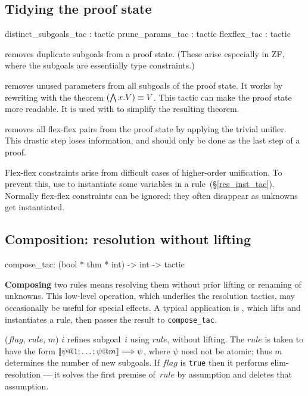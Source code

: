 \subsection{Tidying the proof state}
\begin{ttbox} 
distinct_subgoals_tac : tactic
prune_params_tac      : tactic
flexflex_tac          : tactic
\end{ttbox}
\begin{ttdescription}
\item[\ttindexbold{distinct_subgoals_tac}] removes duplicate subgoals from a
  proof state.  (These arise especially in ZF, where the subgoals are
  essentially type constraints.)

\item[\ttindexbold{prune_params_tac}]  
  removes unused parameters from all subgoals of the proof state.  It works
  by rewriting with the theorem $(\bigwedge x. V)\equiv V$.  This tactic can
  make the proof state more readable.  It is used with
   to simplify the resulting theorem.

\item[\ttindexbold{flexflex_tac}]  
  removes all flex-flex pairs from the proof state by applying the trivial
  unifier.  This drastic step loses information, and should only be done as
  the last step of a proof.

  Flex-flex constraints arise from difficult cases of higher-order
  unification.  To prevent this, use  to instantiate
  some variables in a rule~({\S}\ref{res_inst_tac}).  Normally flex-flex
  constraints can be ignored; they often disappear as unknowns get
  instantiated.
\end{ttdescription}


\subsection{Composition: resolution without lifting}
\begin{ttbox}
compose_tac: (bool * thm * int) -> int -> tactic
\end{ttbox}
{\bf Composing} two rules means resolving them without prior lifting or
renaming of unknowns.  This low-level operation, which underlies the
resolution tactics, may occasionally be useful for special effects.
A typical application is , which lifts and instantiates a
rule, then passes the result to {\tt compose_tac}.
\begin{ttdescription}
\item[\ttindexbold{compose_tac} ($flag$, $rule$, $m$) $i$] 
refines subgoal~$i$ using $rule$, without lifting.  The $rule$ is taken to
have the form $\List{\psi@1; \ldots; \psi@m} \Imp \psi$, where $\psi$ need
not be atomic; thus $m$ determines the number of new subgoals.  If
$flag$ is {\tt true} then it performs elim-resolution --- it solves the
first premise of~$rule$ by assumption and deletes that assumption.
\end{ttdescription}


